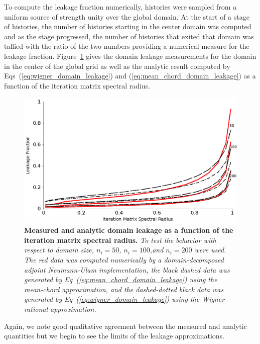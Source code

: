 To compute the leakage fraction numerically,  histories were
sampled from a uniform source of strength unity over the global
domain. At the start of a stage of histories, the number of histories
starting in the center domain was computed and as the stage
progressed, the number of histories that exited that domain was
tallied with the ratio of the two numbers providing a numerical
measure for the leakage fraction. Figure~\ref{fig:measured_leakage}
gives the domain leakage measurements for the domain in the center of
the global grid as well as the analytic result computed by
Eqs~(\ref{eq:wigner_domain_leakage}) and
(\ref{eq:mean_chord_domain_leakage}) as a function of the iteration
matrix spectral radius.
\begin{figure}[t!]
  \begin{spacing}{1.0}
    \begin{center}
      \includegraphics[width=4.75in,clip]{chapters/parallel_mc/leakage_variation_2.pdf}
    \end{center}
    \caption{\textbf{Measured and analytic domain leakage as a
        function of the iteration matrix spectral radius.} \textit{To
        test the behavior with respect to domain size, $n_i=50$,
        $n_i=100$,and $n_i=200$ were used. The red data was computed
        numerically by a domain-decomposed adjoint Neumann-Ulam
        implementation, the black dashed data was generated by
        Eq~(\ref{eq:mean_chord_domain_leakage}) using the mean-chord
        approximation, and the dashed-dotted black data was generated
        by Eq~(\ref{eq:wigner_domain_leakage}) using the Wigner
        rational approximation.}}
    \label{fig:measured_leakage}
  \end{spacing}
\end{figure}
Again, we note good qualitative agreement between the measured and
analytic quantities but we begin to see the limits of the leakage
approximations. 

